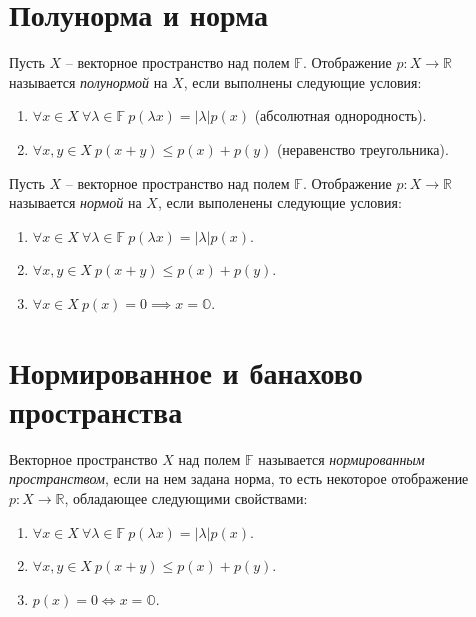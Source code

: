 \section{Полунорма и норма}

\begin{definition}[Полунорма]
	Пусть $X$ -- векторное пространство над полем $\mathbb{F}$. Отображение $p : X \rightarrow \mathbb{R}$ называется \emph{полунормой} на $X$, если выполнены следующие условия:
	\begin{enumerate}
		\item $\forall x \in X \ \forall \lambda \in \mathbb{F} \ p(\lambda x) = |\lambda |p(x)$ (абсолютная однородность).
		\item $\forall x,y \in X \ p(x+y) \leqslant p(x) + p(y)$ (неравенство треугольника).
	\end{enumerate}
\end{definition}

\begin{definition}[Норма]
	Пусть $X$ -- векторное пространство над полем $\mathbb{F}$. Отображение $p: X \rightarrow \mathbb{R}$ называется \emph{нормой} на $X$, если выполенены следующие условия:
	\begin{enumerate}
		\item $\forall x \in X \ \forall \lambda \in \mathbb{F} \ p(\lambda x) = |\lambda |p(x)$.
		\item $\forall x,y \in X \ p(x + y) \leqslant p(x) + p(y)$.
		\item $\forall x \in X \ p(x) = 0 \implies x = \mathbb{O}$.
	\end{enumerate}
\end{definition}

\section{Нормированное и банахово пространства}

\begin{definition}
	Векторное пространство $X$ над полем $\mathbb{F}$ называется \emph{нормированным пространством}, если на нем задана норма, то есть некоторое отображение $p: X \rightarrow \mathbb{R}$, обладающее следующими свойствами:
	\begin{enumerate}
		\item $\forall x \in X \ \forall \lambda \in \mathbb{F} \ p(\lambda x) = |\lambda | p(x)$.
		\item $\forall x,y \in X \ p(x+y) \leqslant p(x) + p(y)$.
		\item $p(x) = 0 \iff x = \mathbb{O}$.
	\end{enumerate}
\end{definition}

